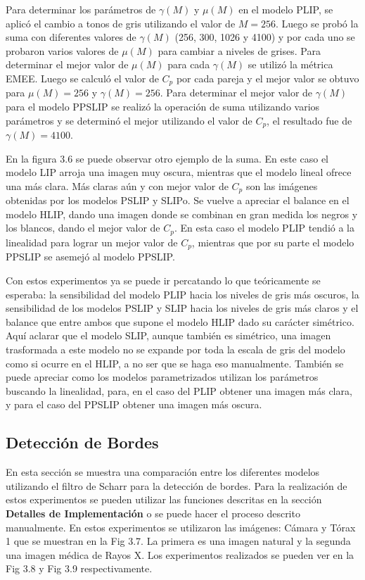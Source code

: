 Para determinar los par\'ametros de $\gamma(M)$ y $\mu(M)$ en el modelo PLIP, se aplic\'o el cambio a tonos de gris utilizando el valor de $M=256$. Luego se prob\'o la suma con diferentes valores de $\gamma(M)$ (256, 300, 1026 y 4100) y por cada uno se probaron varios valores de $\mu(M)$ para cambiar a niveles de grises. Para determinar el mejor valor de $\mu(M)$ para cada $\gamma(M)$ se utiliz\'o la m\'etrica EMEE. Luego se calcul\'o el valor de $C_p$ por cada pareja y el mejor valor se obtuvo para $\mu(M)=256$ y $\gamma(M)=256$. Para determinar el mejor valor de $\gamma(M)$ para el modelo PPSLIP se realiz\'o la operaci\'on de suma utilizando varios par\'ametros y se determin\'o el mejor utilizando el valor de $C_p$, el resultado fue de $\gamma(M)=4100$. 

En la figura 3.6 se puede observar otro ejemplo de la suma. En este caso el modelo LIP arroja una imagen muy oscura, mientras que el modelo lineal ofrece una m\'as clara. M\'as claras a\'un y con mejor valor de $C_p$ son las im\'agenes obtenidas por los modelos PSLIP y SLIPo. Se vuelve a apreciar el balance en el modelo HLIP, dando una imagen donde se combinan en gran medida los negros y los blancos, dando el mejor valor de $C_p$. En esta caso el modelo PLIP tendi\'o a la linealidad para lograr un mejor valor de $C_p$, mientras que por su parte el modelo PPSLIP se asemej\'o al modelo PPSLIP.

Con estos experimentos ya se puede ir percatando lo que te\'oricamente se esperaba: la sensibilidad del modelo PLIP hacia los niveles de gris m\'as oscuros, la sensibilidad de los modelos PSLIP y SLIP hacia los niveles de gris m\'as claros y el balance que entre ambos que supone el modelo HLIP dado su car\'acter sim\'etrico. Aqu\'i aclarar que el modelo SLIP, aunque tambi\'en es sim\'etrico, una imagen trasformada a este modelo no se expande por toda la escala de gris del modelo como si ocurre en el HLIP, a no ser que se haga eso manualmente. Tambi\'en se puede apreciar como los modelos parametrizados utilizan los par\'ametros buscando la linealidad, para, en el caso del PLIP obtener una imagen m\'as clara, y para el caso del PPSLIP obtener una imagen m\'as oscura. 

\subsection{Detecci\'on de Bordes}

En esta secci\'on se muestra una comparaci\'on entre los diferentes modelos utilizando el filtro de Scharr para la detecci\'on de bordes. Para la realizaci\'on de estos experimentos se pueden utilizar las funciones descritas en la secci\'on \textbf{Detalles de Implementaci\'on} o se puede hacer el proceso descrito manualmente. En estos experimentos se utilizaron las im\'agenes: C\'amara y T\'orax 1 que se muestran en la Fig 3.7. La primera es una imagen natural y la segunda una imagen m\'edica de Rayos X. Los experimentos realizados se pueden ver en la Fig 3.8 y Fig 3.9 respectivamente.

